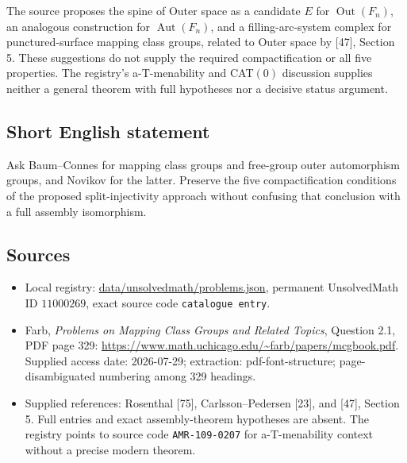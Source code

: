 \documentclass[11pt]{article}
\begin{document}
The source proposes the spine of Outer space as a candidate $E$ for $\operatorname{Out}(F_n)$, an analogous construction for $\operatorname{Aut}(F_n)$, and a filling-arc-system complex for punctured-surface mapping class groups, related to Outer space by [47], Section 5. These suggestions do not supply the required compactification or all five properties. The registry's a-T-menability and CAT$(0)$ discussion supplies neither a general theorem with full hypotheses nor a decisive status argument.
\subsection{Short English statement}
Ask Baum--Connes for mapping class groups and free-group outer automorphism groups, and Novikov for the latter. Preserve the five compactification conditions of the proposed split-injectivity approach without confusing that conclusion with a full assembly isomorphism.
\subsection{Sources}
\begin{itemize}
\item Local registry: \url{data/unsolvedmath/problems.json}, permanent UnsolvedMath ID $11000269$, exact source code \texttt{catalogue entry}.
\item Farb, \emph{Problems on Mapping Class Groups and Related Topics}, Question 2.1, PDF page 329: \url{https://www.math.uchicago.edu/~farb/papers/mcgbook.pdf}. Supplied access date: 2026-07-29; extraction: pdf-font-structure; page-disambiguated numbering among 329 headings.
\item Supplied references: Rosenthal [75], Carlsson--Pedersen [23], and [47], Section 5. Full entries and exact assembly-theorem hypotheses are absent. The registry points to source code \texttt{AMR-109-0207} for a-T-menability context without a precise modern theorem.
\end{itemize}
\end{document}
